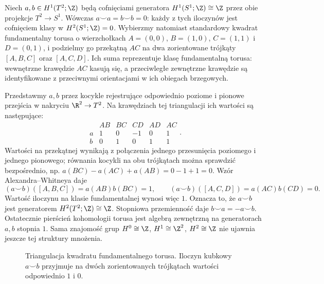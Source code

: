 \begin{przyklad}
\label{prz:kohomologia-kubek-torus}
Niech $a,b\in H^1(T^2;\Z)$ będą cofnięciami generatora
$H^1(S^1;\Z)\cong\Z$ przez obie projekcje
$T^2\to S^1$. Wówczas $a\smile a=b\smile b=0$:
każdy z tych iloczynów jest cofnięciem klasy
w $H^2(S^1;\Z)=0$. Wybierzmy natomiast
standardowy kwadrat fundamentalny torusa
o wierzchołkach
$A=(0,0)$, $B=(1,0)$, $C=(1,1)$ i $D=(0,1)$,
i podzielmy go przekątną $AC$ na dwa
zorientowane trójkąty $[A,B,C]$ oraz $[A,C,D]$.
Ich suma reprezentuje klasę fundamentalną torusa:
wewnętrzne krawędzie $AC$ kasują się,
a przeciwległe zewnętrzne krawędzie
są identyfikowane z przeciwnymi orientacjami
w ich obiegach brzegowych.

Przedstawmy $a,b$ przez kocykle rejestrujące
odpowiednio poziome i pionowe przejścia
w nakryciu $\R^2\to T^2$. Na krawędziach
tej triangulacji ich wartości są następujące:
\[
\begin{array}{c|rrrrr}
 & AB & BC & CD & AD & AC\\ \hline
 a & 1&0&-1&0&1\\
 b & 0&1&0&1&1
\end{array}.
\]
Wartości na przekątnej wynikają z połączenia
jednego przesunięcia poziomego i jednego pionowego;
równania kocykli na obu trójkątach można sprawdzić
bezpośrednio, np. $a(BC)-a(AC)+a(AB)=0-1+1=0$.
Wzór Alexandra--Whitneya daje
\[
 (a\smile b)([A,B,C])=a(AB)b(BC)=1,\qquad
 (a\smile b)([A,C,D])=a(AC)b(CD)=0.
\]
Wartość iloczynu na klasie fundamentalnej wynosi więc $1$.
Oznacza to, że $a\smile b$ jest generatorem
$H^2(T^2;\Z)\cong\Z$.
Stopniowa przemienność daje
$b\smile a=-a\smile b$.
Ostatecznie pierścień kohomologii torusa
jest algebrą zewnętrzną na generatorach $a,b$ stopnia $1$.
Sama znajomość grup $H^0\cong\Z$,
$H^1\cong\Z^2$, $H^2\cong\Z$
nie ujawnia jeszcze tej struktury mnożenia.
\end{przyklad}

\begin{figure}[!htbp]
\centering
{}
\caption{Triangulacja kwadratu fundamentalnego torusa.
Iloczyn kubkowy $a\smile b$ przyjmuje na dwóch
zorientowanych trójkątach wartości odpowiednio $1$ i $0$.}
\label{fig:kubek-torus}
\end{figure}

